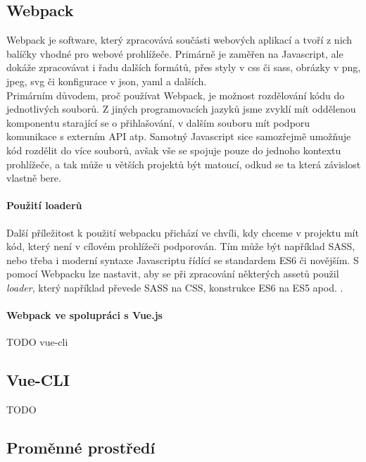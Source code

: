 \subsection{Webpack}

Webpack \cite{webpack} je software, který zpracovává součásti webových aplikací a tvoří z nich balíčky vhodné pro webové prohlížeče. Primárně je zaměřen na Javascript, ale dokáže zpracovávat i řadu dalších formátů, přes styly v css či sass, obrázky v png, jpeg, svg či konfigurace v json, yaml a dalších.\\
Primárním důvodem, proč používat Webpack, je možnost rozdělování kódu do jednotlivých souborů. Z jiných programovacích jazyků jsme zvyklí mít oddělenou komponentu starající se o přihlašování, v dalším souboru mít podporu komunikace s externím API atp. Samotný Javascript sice samozřejmě umožňuje kód rozdělit do více souborů, avšak vše se spojuje pouze do jednoho kontextu prohlížeče, a tak může u větších projektů být matoucí, odkud se ta která závislost vlastně bere.

\paragraph{Použití loaderů} Další příležitost k použití webpacku přichází ve chvíli, kdy chceme v projektu mít kód, který není v cílovém prohlížeči podporován. Tím může být například SASS, nebo třeba i moderní syntaxe Javascriptu řídící se standardem ES6 či novějším. S pomocí Webpacku lze nastavit, aby se při zpracování některých assetů použil \emph{loader}, který například převede SASS na CSS, konstrukce ES6 na ES5 apod. \cite{webpack-ackee}.

\paragraph{Webpack ve spolupráci s Vue.js} TODO vue-cli


\subsection{Vue-CLI}

TODO


\subsection{Proměnné prostředí}

